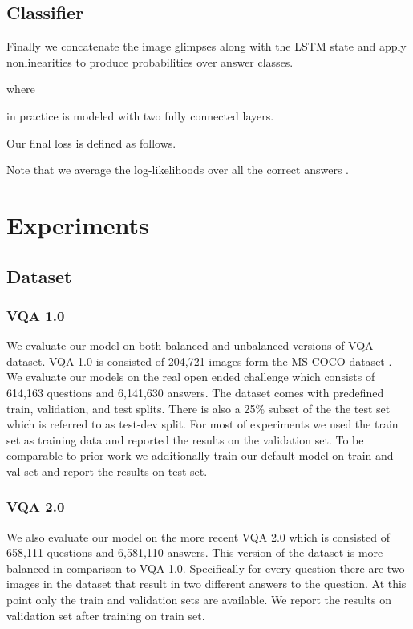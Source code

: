 \documentclass[10pt,twocolumn,letterpaper]{article}
\begin{document}
\subsection{Classifier}
Finally we concatenate the image glimpses along with the LSTM state and apply nonlinearities to produce probabilities over answer classes.

where 

 in practice is modeled with two fully connected layers.

Our final loss is defined as follows.

Note that we average the log-likelihoods over all the correct answers .

\section{Experiments}
\subsection{Dataset}
\subsubsection{VQA 1.0}
We evaluate our model on both balanced and unbalanced versions of VQA dataset.
VQA 1.0 \cite{Antol2015VQAVQ} is consisted of 204,721 images form the MS COCO dataset \cite{Lin2014MicrosoftCC}.
We evaluate our models on the real open ended challenge which consists of  614,163 questions and 6,141,630 answers. The dataset comes with predefined train, validation, and test splits. There is also a 25\% subset of the the test set which is referred to as test-dev split. For most of experiments we used the train set as training data and reported the results on the validation set. To be comparable to prior work we additionally train our default model on train and val set and report the results on test set.

\subsubsection{VQA 2.0}
We also evaluate our model on the more recent VQA 2.0 \cite{Goyal2016MakingTV} which is consisted of 658,111 questions and 6,581,110 answers. This version of the dataset is more balanced in comparison to VQA 1.0. Specifically for every question there are two images in the dataset that result in two different answers to the question. At this point only the train and validation sets are available. We report the results on validation set after training on train set.
\end{document}
